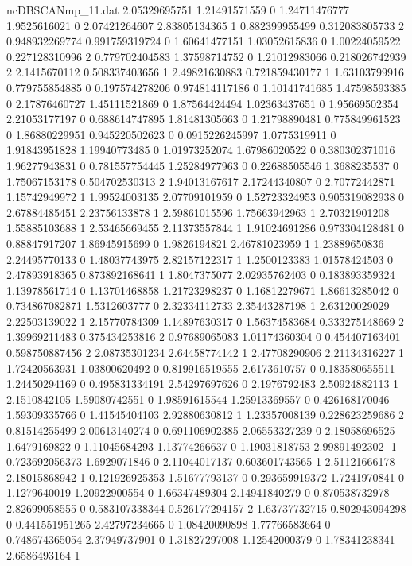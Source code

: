 \begin{filecontents}{ncDBSCANmp_11.dat}
2.05329695751 1.21491571559 0
1.24711476777 1.9525616021 0
2.07421264607 2.83805134365 1
0.882399955499 0.312083805733 2
0.948932269774 0.991759319724 0
1.60641477151 1.03052615836 0
1.00224059522 0.227128310996 2
0.779702404583 1.37598714752 0
1.21012983066 0.218026742939 2
2.1415670112 0.508337403656 1
2.49821630883 0.721859430177 1
1.63103799916 0.779755854885 0
0.197574278206 0.974814117186 0
1.10141741685 1.47598593385 0
2.17876460727 1.45111521869 0
1.87564424494 1.02363437651 0
1.95669502354 2.21053177197 0
0.688614747895 1.81481305663 0
1.21798890481 0.775849961523 0
1.86880229951 0.945220502623 0
0.0915226245997 1.0775319911 0
1.91843951828 1.19940773485 0
1.01973252074 1.67986020522 0
0.380302371016 1.96277943831 0
0.781557754445 1.25284977963 0
0.22688505546 1.3688235537 0
1.75067153178 0.504702530313 2
1.94013167617 2.17244340807 0
2.70772442871 1.15742949972 1
1.99524003135 2.07709101959 0
1.52723324953 0.905319082938 0
2.67884485451 2.23756133878 1
2.59861015596 1.75663942963 1
2.70321901208 1.55885103688 1
2.53465669455 2.11373557844 1
1.91024691286 0.973304128481 0
0.88847917207 1.86945915699 0
1.9826194821 2.46781023959 1
1.23889650836 2.24495770133 0
1.48037743975 2.82157122317 1
1.2500123383 1.01578424503 0
2.47893918365 0.873892168641 1
1.8047375077 2.02935762403 0
0.183893359324 1.13978561714 0
1.13701468858 1.21723298237 0
1.16812279671 1.86613285042 0
0.734867082871 1.5312603777 0
2.32334112733 2.35443287198 1
2.63120029029 2.22503139022 1
2.15770784309 1.14897630317 0
1.56374583684 0.333275148669 2
1.39969211483 0.375434253816 2
0.97689065083 1.01174360304 0
0.454407163401 0.598750887456 2
2.08735301234 2.64458774142 1
2.47708290906 2.21134316227 1
1.72420563931 1.03800620492 0
0.819916519555 2.6173610757 0
0.183580655511 1.24450294169 0
0.495831334191 2.54297697626 0
2.1976792483 2.50924882113 1
2.1510842105 1.59080742551 0
1.98591615544 1.25913369557 0
0.426168170046 1.59309335766 0
1.41545404103 2.92880630812 1
1.23357008139 0.228623259686 2
0.81514255499 2.00613140274 0
0.691106902385 2.06553327239 0
2.18058696525 1.6479169822 0
1.11045684293 1.13774266637 0
1.19031818753 2.99891492302 -1
0.723692056373 1.6929071846 0
2.11044017137 0.603601743565 1
2.51121666178 2.18015868942 1
0.121926925353 1.51677793137 0
0.293659919372 1.7241970841 0
1.1279640019 1.20922900554 0
1.66347489304 2.14941840279 0
0.870538732978 2.82699058555 0
0.583107338344 0.526177294157 2
1.63737732715 0.802943094298 0
0.441551951265 2.42797234665 0
1.08420090898 1.77766583664 0
0.748674365054 2.37949737901 0
1.31827297008 1.12542000379 0
1.78341238341 2.6586493164 1

\end{filecontents}
